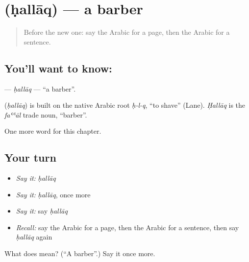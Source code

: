 \section[\texorpdfstring{\ar{حلاق} (ḥallāq)}{حلاق (ḥallāq)}]{ (ḥallāq) — a barber}

\label{lesson:AR-C282-hallaq}



\begin{quote}
Before the new one: say the Arabic for a page, then the Arabic for a sentence.
\end{quote}

\subsection*{You'll want to know: }
\textbf{} — \emph{ḥallāq} — \textquotedblleft{}a barber\textquotedblright{}.

\begin{cousinweb}
\textbf{} (\emph{ḥallāq}) is built on the native Arabic root \emph{ḥ-l-q}, \textquotedblleft{}to shave\textquotedblright{} (Lane). \emph{Ḥallāq} is the \emph{faʿʿāl} trade noun, \textquotedblleft{}barber\textquotedblright{}.
\end{cousinweb}

\begin{grammarlens}[title={What you've built}]
One more word for this chapter.
\end{grammarlens}

\subsection*{Your turn}
\begin{itemize}
\raggedright
  \item \emph{Say it:} \emph{ḥallāq}
  \item \emph{Say it:} \emph{ḥallāq}, once more
  \item \emph{Say it:} say \emph{ḥallāq}
  \item \emph{Recall:} say the Arabic for a page, then the Arabic for a sentence, then say \emph{ḥallāq} again
\end{itemize}

\begin{tcolorbox}[breakable,colback=teal!4,colframe=teal!35!black,title={Before you move on}]
What does  mean? (\textquotedblleft{}A barber\textquotedblright{}.) Say it once more.
\end{tcolorbox}
